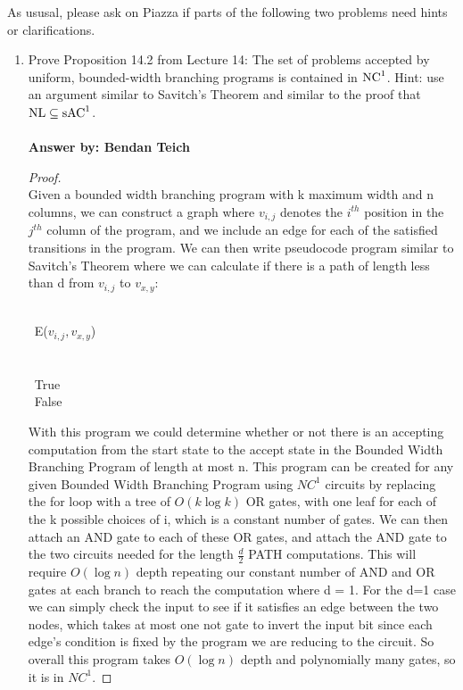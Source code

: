 \documentclass[12pt]{article}
\begin{document}
\thispagestyle{empty}
\noindent{}
\addtocounter{section}{9}

As ususal, please ask on Piazza if parts of the following two problems need hints or clarifications.

\begin{enumerate}

\item Prove Proposition 14.2 from Lecture 14:  The set of problems accepted by uniform, bounded-width branching
  programs is contained in  $\mbox{{\rm NC}}^1$.  Hint: use an argument similar to Savitch's Theorem and similar
  to the proof that $\mbox{{\rm NL}} \subseteq \mbox{{\rm sAC}}^1$.\\ \\
   {\bf Answer by: Bendan Teich} \\
   \begin{proof} \\
   	Given a bounded width branching program with k maximum width and n columns, we can construct a graph where $v_{i,j}$ denotes the $i^{th}$ position in the $j^{th}$ column of the program, and we include an edge for each of the satisfied transitions in the program.
   	We can then write pseudocode program similar to Savitch's Theorem where we can calculate if there is a path of length less than d from $v_{i,j}$ to $v_{x,y}$:
   	\begin{algorithm}[H]
   	\caption{$REACH(v_{i,j},v_{x,y},d)$}
   		 \\
   		 \text{\qquad} \Return\  E($v_{i,j},v_{x,y}$)\\
		\\
			\text{\qquad} \\
				\text{\qquad} \text{\qquad} \Return\ True\\
		\Return\ False\\
	\end{algorithm}
	With this program we could determine whether or not there is an accepting computation from the start state to the accept state in the Bounded Width Branching Program of length at most n.  This program can be created for any given Bounded Width Branching Program using $NC^1$ circuits by replacing the for loop with a tree of $O(k\log{k})$  OR gates, with one leaf for each of the k possible choices of i, which is a constant number of gates.  We can then attach an AND gate to each of these OR gates, and attach the AND gate to the two circuits needed for the length $\frac{d}{2}$ PATH computations.  This will require $O(\log n)$ depth repeating our constant number of AND and OR gates at each branch to reach the computation where d = 1.  For the d=1 case we can simply check the input to see if it satisfies an edge between the two nodes, which takes at most one not gate to invert the input bit since each edge's condition is fixed by the program we are reducing to the circuit.  So overall this program takes $O(\log n)$ depth and polynomially many gates, so it is in $NC^1$.
	

\end{proof}
\end{enumerate}
\end{document}
